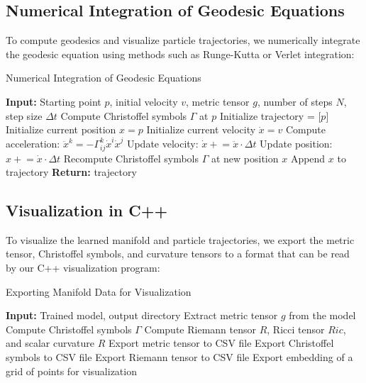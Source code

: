 \documentclass[11pt,a4paper]{article}
\begin{document}
\subsection{Numerical Integration of Geodesic Equations}

To compute geodesics and visualize particle trajectories, we numerically integrate the geodesic equation using methods such as Runge-Kutta or Verlet integration:

\begin{algorithm}
\caption{Numerical Integration of Geodesic Equations}
\begin{algorithmic}[1]
\State \textbf{Input:} Starting point $p$, initial velocity $v$, metric tensor $g$, number of steps $N$, step size $\Delta t$
\State Compute Christoffel symbols $\Gamma$ at $p$
\State Initialize trajectory = [$p$]
\State Initialize current position $x = p$
\State Initialize current velocity $\dot{x} = v$
    \State Compute acceleration: $\ddot{x}^k = -\Gamma^k_{ij} \dot{x}^i \dot{x}^j$
    \State Update velocity: $\dot{x} \mathrel{+}= \ddot{x} \cdot \Delta t$
    \State Update position: $x \mathrel{+}= \dot{x} \cdot \Delta t$
    \State Recompute Christoffel symbols $\Gamma$ at new position $x$
    \State Append $x$ to trajectory
\EndFor
\State \textbf{Return:} trajectory
\end{algorithmic}
\end{algorithm}

\subsection{Visualization in C++}

To visualize the learned manifold and particle trajectories, we export the metric tensor, Christoffel symbols, and curvature tensors to a format that can be read by our C++ visualization program:

\begin{algorithm}
\caption{Exporting Manifold Data for Visualization}
\begin{algorithmic}[1]
\State \textbf{Input:} Trained model, output directory
\State Extract metric tensor $g$ from the model
\State Compute Christoffel symbols $\Gamma$
\State Compute Riemann tensor $R$, Ricci tensor $Ric$, and scalar curvature $R$
\State Export metric tensor to CSV file
\State Export Christoffel symbols to CSV file
\State Export Riemann tensor to CSV file
\State Export embedding of a grid of points for visualization
\end{algorithmic}
\end{algorithm}
\end{document}
